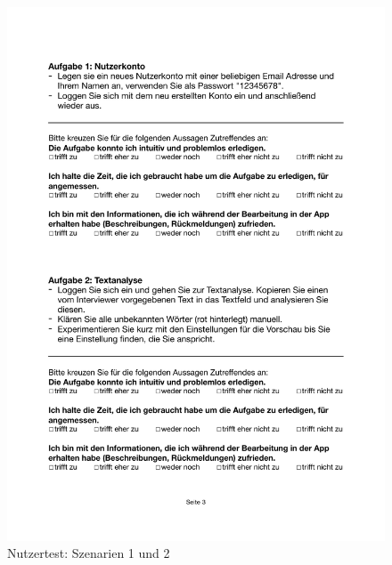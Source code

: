 \begin{figure}[h]
	\centering
	\includegraphics[width=.95\linewidth, frame]{figures/evaluation/test12}
	\caption{Nutzertest: Szenarien 1 und 2}
	\label{fig:evaluation-test12}
\end{figure}
\newpage

